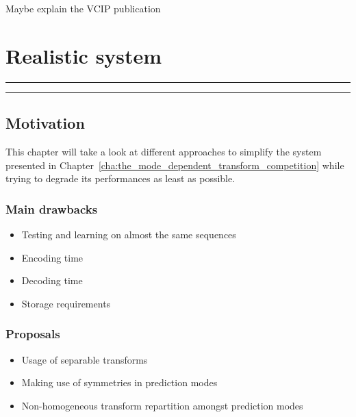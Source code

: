 \documentclass[11pt,a4paper,openright,twoside]{book}
\providecommand{\chaptertoc}{
	\startcontents[chapters]
	\hrule
	\vspace{1em}
	\printcontents[chapters]{}{1}{{\bf\large Contents}}
	\hrule
}
\numberwithin{equation}{section} %
\begin{document}
\vspace{0.5cm}
Maybe explain the VCIP
publication~\cite{arrufat-14-transform-competition-rdot}

\chapter{Realistic system}
\label{cha:realistic_system}
\chaptertoc

\section{Motivation}
\label{sec:motivation}

This chapter will take a look at different approaches to simplify the
system presented in
Chapter~\ref{cha:the_mode_dependent_transform_competition} while trying
to degrade its performances as least as possible.

\subsection{Main drawbacks}
\label{sub:main_drawbacks}

\begin{itemize}
	\item Testing and learning on almost the same sequences
	\item Encoding time
	\item Decoding time
	\item Storage requirements
\end{itemize}

\subsection{Proposals}
\label{sub:proposals}

\begin{itemize}
	\item Usage of separable transforms
	\item Making use of symmetries in prediction modes
	\item Non-homogeneous transform repartition amongst prediction modes
\end{itemize}

\backmatter


\end{document}
